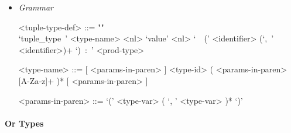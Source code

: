 \documentclass{article}
\begin{document}
\begin{itemize}
\item \textit{Grammar}

\begin{grammar}
<tuple-type-def> ::= ""\\
`tuple_type\ ' <type-name> <nl>
`value' <nl> `\ \ (' <identifier> (`,\ ' <identifier>)+ `)\ :\ ' <prod-type>

<type-name> ::= 
[ <params-in-paren> ] <type-id> ( <params-in-paren> [A-Za-z]+ )*
[ <params-in-paren> ]

<params-in-paren> ::= `(' <type-var> ( `, ' <type-var> )* `)'
\end{grammar}

\end{itemize}

\paragraph{Or Types}
\end{document}

